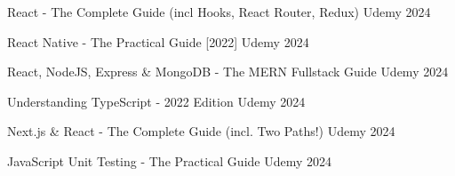 
\begin{cvcertifications}

  \cvcert
    {React - The Complete Guide (incl Hooks, React Router, Redux)} %
    {Udemy} %
    {2024} %
    {} %

  \cvcert
    {React Native - The Practical Guide [2022]} %
    {Udemy} %
    {2024} %
    {} %

  \cvcert
    {React, NodeJS, Express \& MongoDB - The MERN Fullstack Guide} %
    {Udemy} %
    {2024} %
    {} %

  \cvcert
    {Understanding TypeScript - 2022 Edition} %
    {Udemy} %
    {2024} %
    {} %
    
  \cvcert
    {Next.js \& React - The Complete Guide (incl. Two Paths!)} %
    {Udemy} %
    {2024} %
    {} %

  \cvcert
    {JavaScript Unit Testing - The Practical Guide} %
    {Udemy} %
    {2024} %
    {} %

\end{cvcertifications}
